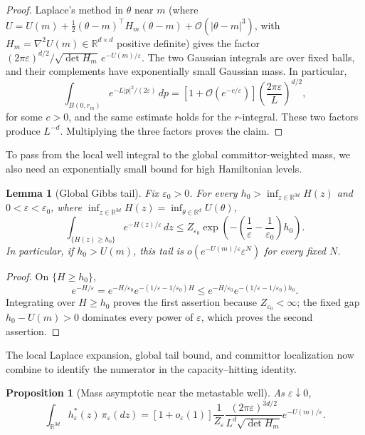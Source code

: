 \documentclass[11pt]{article}
\numberwithin{equation}{section}
\theoremstyle{plain}
\newtheorem{proposition}[theorem]{Proposition}
\newtheorem{lemma}[theorem]{Lemma}
\theoremstyle{definition}
\theoremstyle{remark}
\newcommand{\R}{\mathbb R}
\newcommand{\eps}{\varepsilon}
\begin{document}
\begin{proof}
Laplace's method in $\theta$ near $m$ (where
$U=U(m)+\frac12(\theta-m)^\top H_m(\theta-m)+\mathcal O(|\theta-m|^3)$,
{with $H_m=\nabla^2U(m)\in\R^{d\times d}$ positive definite}) gives the
factor $(2\pi\eps)^{d/2}/\sqrt{\det H_m}\,e^{-U(m)/\eps}$.  The two Gaussian
integrals are over fixed balls, and their complements have exponentially
small Gaussian mass.  In particular,
\[
\int_{B(0,r_m)}e^{-L|p|^2/(2\eps)}\,dp
=\left[1+\mathcal O\left(e^{-c/\eps}\right)\right]
\left(\frac{2\pi\eps}{L}\right)^{d/2},
\]
for some $c>0$, and the same estimate holds for the $r$-integral.  These two
factors produce $L^{-d}$.  Multiplying the three factors proves the claim.
\end{proof}

To pass from the local well integral to the global
committor-weighted mass, we also need an exponentially small bound for high
Hamiltonian levels.

\begin{lemma}[Global Gibbs tail]
\label{lem:global-gibbs-tail}
Fix $\eps_0>0$.  For every $h_0>\inf_{z\in\R^{3d}}H(z)$ and
$0<\eps<\eps_0$, where $\inf_{z\in\R^{3d}}H(z)=\inf_{\theta\in\R^d}U(\theta)$,
\[
\int_{\{H(z)\ge h_0\}}e^{-H(z)/\eps}\,dz
\le Z_{\eps_0}
\exp\!\left(-\left(\frac1\eps-\frac1{\eps_0}\right)h_0\right).
\]
In particular, if $h_0>U(m)$, this tail is
$o(e^{-U(m)/\eps}\eps^N)$ for every fixed $N$.
\end{lemma}

\begin{proof}
On $\{H\ge h_0\}$,
\[
e^{-H/\eps}=e^{-H/\eps_0}
e^{-(1/\eps-1/\eps_0)H}
\le e^{-H/\eps_0}
e^{-(1/\eps-1/\eps_0)h_0}.
\]
Integrating over $H\geq h_{0}$ proves the first assertion because $Z_{\eps_0}<\infty$; the fixed
gap $h_0-U(m)>0$ dominates every power of $\eps$, which proves the second assertion.
\end{proof}

The local Laplace expansion, global tail bound, and committor
localization now combine to identify the numerator in the capacity--hitting
identity.

\begin{proposition}[Mass asymptotic near the metastable well]
\label{prop:mass-asymptotic}
As $\eps\downarrow0$,
\begin{equation}
\label{eq:mass-asymptotic}
\int_{\R^{3d}} h_\eps^*(z)\,\pi_\eps(dz)
=
[1+o_\eps(1)]
\frac{1}{Z_\eps}
\frac{(2\pi\eps)^{3d/2}}{L^d\sqrt{\det H_m}}
e^{-U(m)/\eps}.
\end{equation}
\end{proposition}
\end{document}

